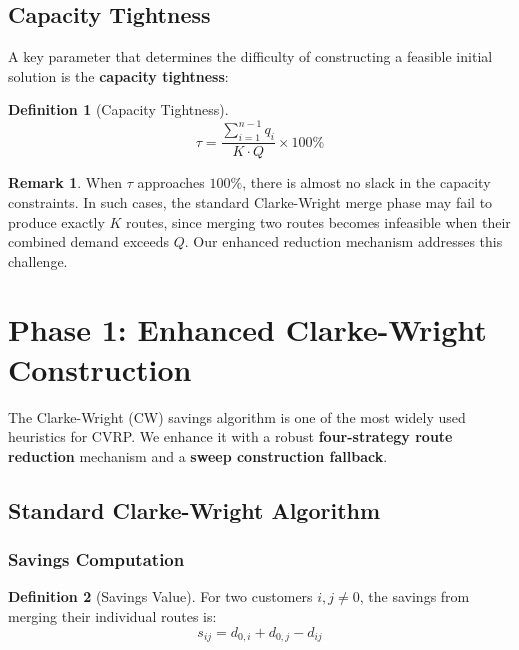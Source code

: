 \documentclass[12pt,a4paper]{article}
\theoremstyle{definition}
\newtheorem{definition}{Definition}[section]
\newtheorem{remark}{Remark}[section]
\begin{document}
\subsection{Capacity Tightness}

A key parameter that determines the difficulty of constructing a feasible initial solution is the \textbf{capacity tightness}:

\begin{definition}[Capacity Tightness]
\begin{equation}
\tau = \frac{\sum_{i=1}^{n-1} q_i}{K \cdot Q} \times 100\%
\end{equation}
\end{definition}

\begin{remark}
When $\tau$ approaches $100\%$, there is almost no slack in the capacity constraints. In such cases, the standard Clarke-Wright merge phase may fail to produce exactly $K$ routes, since merging two routes becomes infeasible when their combined demand exceeds $Q$. Our enhanced reduction mechanism addresses this challenge.
\end{remark}

\section{Phase 1: Enhanced Clarke-Wright Construction}

The Clarke-Wright (CW) savings algorithm is one of the most widely used heuristics for CVRP. We enhance it with a robust \textbf{four-strategy route reduction} mechanism and a \textbf{sweep construction fallback}.

\subsection{Standard Clarke-Wright Algorithm}

\subsubsection{Savings Computation}

\begin{definition}[Savings Value]
For two customers $i, j \neq 0$, the savings from merging their individual routes is:
\begin{equation}
s_{ij} = d_{0,i} + d_{0,j} - d_{ij}
\end{equation}
\end{definition}
\end{document}
